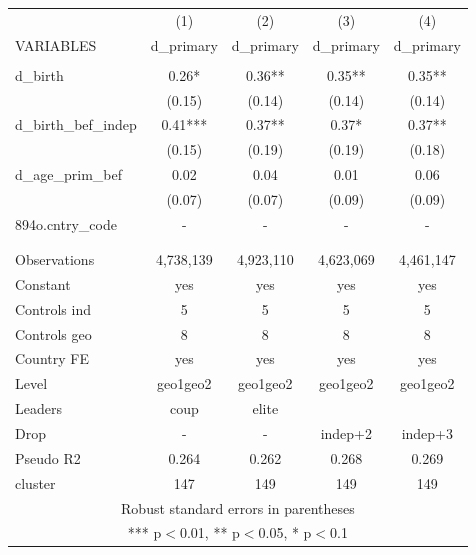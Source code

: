 \documentclass[]{article}
\begin{document}
\begin{tabular}{lcccc} \hline
 & (1) & (2) & (3) & (4) \\
VARIABLES & d\_primary & d\_primary & d\_primary & d\_primary \\ \hline
 &  &  &  &  \\
d\_birth & 0.26* & 0.36** & 0.35** & 0.35** \\
 & (0.15) & (0.14) & (0.14) & (0.14) \\
d\_birth\_bef\_indep & 0.41*** & 0.37** & 0.37* & 0.37** \\
 & (0.15) & (0.19) & (0.19) & (0.18) \\
d\_age\_prim\_bef & 0.02 & 0.04 & 0.01 & 0.06 \\
 & (0.07) & (0.07) & (0.09) & (0.09) \\
894o.cntry\_code & - & - & - & - \\
 &  &  &  &  \\
 &  &  &  &  \\
Observations & 4,738,139 & 4,923,110 & 4,623,069 & 4,461,147 \\
Constant & yes & yes & yes & yes \\
Controls ind & 5 & 5 & 5 & 5 \\
Controls geo & 8 & 8 & 8 & 8 \\
Country FE & yes & yes & yes & yes \\
Level & geo1geo2 & geo1geo2 & geo1geo2 & geo1geo2 \\
Leaders & coup & elite &  &  \\
Drop & - & - & indep+2 & indep+3 \\
Pseudo R2 & 0.264 & 0.262 & 0.268 & 0.269 \\
 cluster & 147 & 149 & 149 & 149 \\ \hline
\multicolumn{5}{c}{ Robust standard errors in parentheses} \\
\multicolumn{5}{c}{ *** p$<$0.01, ** p$<$0.05, * p$<$0.1} \\
\end{tabular}
\end{document}
